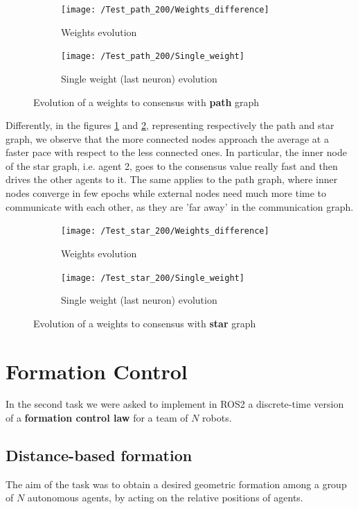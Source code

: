 \documentclass[a4paper,11pt,oneside]{book}
\begin{document}
\begin{figure}[h]
\centering
	\begin{subfigure}{0.49\textwidth}	
	\texttt{[image: /Test\_path\_200/Weights\_difference]}
	\caption{Weights evolution}
	\end{subfigure}
\hfill
	\begin{subfigure}{0.49\textwidth}	
	\texttt{[image: /Test\_path\_200/Single\_weight]}
	\caption{Single weight (last neuron) evolution}
	\end{subfigure}
\caption{Evolution of a weights to consensus with \textbf{path} graph}
\label{path_test}
\end{figure}

Differently, in the figures \ref{path_test} and \ref{star_test}, representing respectively the path and star graph, we observe that the more connected nodes approach the average at a faster pace with respect to the less connected ones. In particular, the inner node of the star graph, i.e. agent 2, goes to the consensus value really fast and then drives the other agents to it. The same applies to the path graph, where inner nodes converge in few epochs while external nodes need much more time to communicate with each other, as they are 'far away' in the communication graph.


\begin{figure}[h]
\centering
	\begin{subfigure}{0.49\textwidth}	
	\texttt{[image: /Test\_star\_200/Weights\_difference]}
	\caption{Weights evolution}
	\end{subfigure}
\hfill
	\begin{subfigure}{0.49\textwidth}	
	\texttt{[image: /Test\_star\_200/Single\_weight]}
	\caption{Single weight (last neuron) evolution}
	\end{subfigure}
\caption{Evolution of a weights to consensus with \textbf{star} graph}
\label{star_test}
\end{figure}




\chapter{Formation Control} 
 In the second task we were asked to implement in ROS2 a discrete-time version of a \textbf{formation control law} for a team of $N$ robots.

\section{Distance-based formation}
The aim of the task was to obtain a desired geometric formation among a group of $N$ autonomous agents, by acting on the relative positions of agents.
\end{document}
